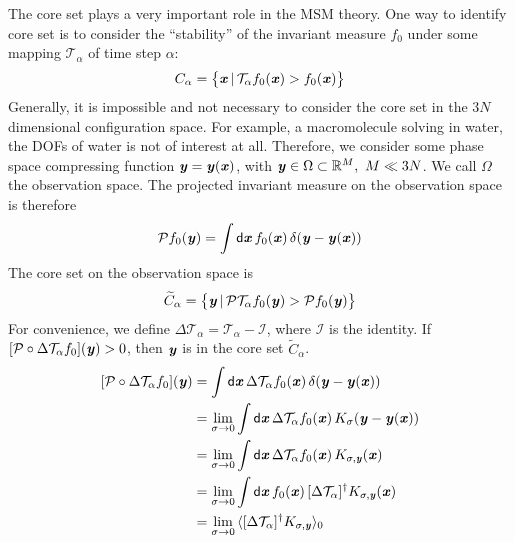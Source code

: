\documentclass[aip,jcp,a4paper,reprint,onecolumn]{revtex4-1}
\newcommand{\vect}[1]{\textbf{\textit{#1}}}
\newcommand{\dd}{\textsf{d}}
\newcommand{\mt}{\mathcal T}
\begin{document}
The core set plays a very important role in the MSM theory. One way to
identify core set is to consider the ``stability'' of the invariant
measure $f_0$ under some mapping $\mt_\alpha$ of time step $\alpha$:
\begin{align}
  C_\alpha = \big\{
  \vect x \,\vert\, \mt_\alpha f_0(\vect x) > f_0(\vect x)
  \big\}
\end{align}
Generally, it is impossible and not necessary to consider the core set
in the $3N$ dimensional configuration space. For example, a
macromolecule solving in water, the DOFs of water is not of interest
at all. Therefore, we consider some phase space compressing function
$\vect y = \vect y(\vect x)$, with $\vect y \in \Omega \subset \mathbb
R^M,\ M\ll 3N$. We call $\Omega$ the observation space.  The projected
invariant measure on the observation space is therefore
\begin{align}
  \mathcal P f_0 (\vect y)
  =
  \int
  \dd \vect x\,
  f_0(\vect x) \,
  \delta (\vect y - \vect y(\vect x)) 
\end{align}
The core set on the observation space is
\begin{align}
  \widetilde
  C_\alpha = \big\{
  \vect y \,\vert\,
  \mathcal P\mt_\alpha f_0(\vect y) > \mathcal P f_0(\vect y)
  \big\}
\end{align}
For convenience, we define $\Delta \mt_\alpha =
\mt_\alpha - \mathcal I$, where $\mathcal I$ is the
identity. If $[\mathcal P\circ\Delta \mt_\alpha f_0](\vect y) > 0$, then
$\vect y$ is in the core set $\widetilde C_\alpha $.
\begin{align}\nonumber
  [\mathcal P\circ\Delta \mt_\alpha f_0](\vect y)
  &=
  \int
  \dd \vect x\,
  \Delta \mt_\alpha f_0(\vect x) \,
  \delta (\vect y - \vect y(\vect x))  \\\nonumber
  &=
  \lim_{\sigma \rightarrow 0}
  \int
  \dd \vect x\,
  \Delta \mt_\alpha f_0(\vect x) \,
  K_{\sigma} (\vect y - \vect y(\vect x))  \\\nonumber
  &=
  \lim_{\sigma \rightarrow 0}
  \int
  \dd \vect x\,
  \Delta \mt_\alpha f_0(\vect x) \,
  K_{\sigma, \vect y} (\vect x)  \\\nonumber
  &=
  \lim_{\sigma \rightarrow 0}
  \int
  \dd \vect x\,
  f_0(\vect x) \,
  [\Delta \mt_\alpha]^\dagger K_{\sigma, \vect y} (\vect x)\\
  &=
  \lim_{\sigma \rightarrow 0}\,
  \langle
  [\Delta \mt_\alpha]^\dagger K_{\sigma, \vect y}
  \rangle_0
\end{align}
\end{document}
